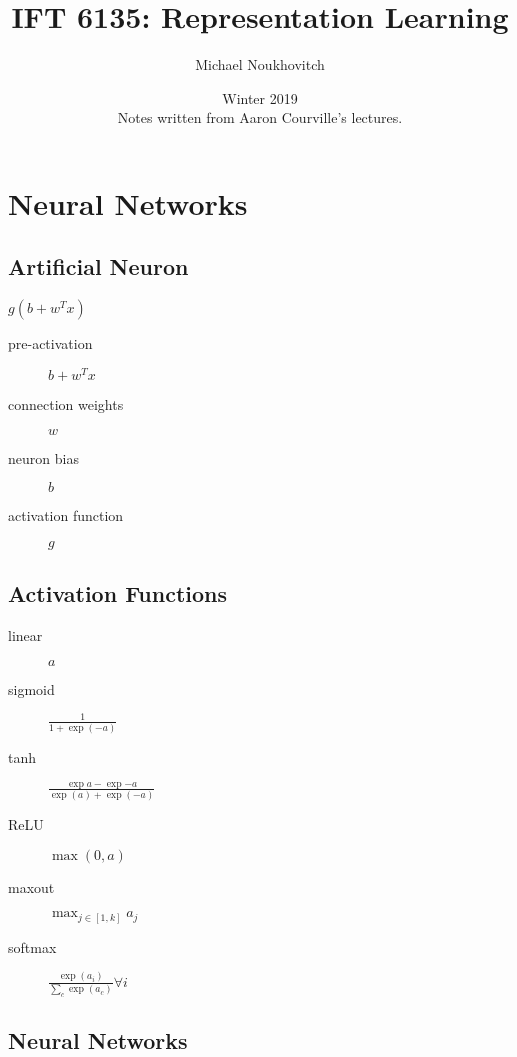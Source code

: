 \documentclass[]{article}
\begin{document}
\title{\bf{IFT 6135: Representation Learning}}
\date{Winter 2019 \\ \center Notes written from Aaron Courville's lectures.}
\author{Michael Noukhovitch}

\maketitle
\newpage
\tableofcontents
\newpage

\section{Neural Networks}%
\label{sec:neural_networks}

\subsection{Artificial Neuron}%
\label{sub:artificial_neuron}

$g(b + w^Tx)$
\begin{description}
    \item[pre-activation] $b + w^Tx$
    \item[connection weights] $w$
    \item[neuron bias] $b$
    \item[activation function] $g$
\end{description}

\subsection{Activation Functions}%
\label{sub:activation_functions}

\begin{description}
    \item[linear] $a$
    \item[sigmoid] $\frac{1}{1 + \exp(-a)}$
    \item[tanh] $\frac{\exp{a} - \exp{-a}}{\exp(a) + \exp(-a)}$
    \item[ReLU] $\max(0,a)$
    \item[maxout] $\max_{j \in [1,k]} a_j$
    \item[softmax] $\frac{\exp(a_i)}{\sum_c \exp(a_c)} \forall i$
\end{description}

\subsection{Neural Networks}%
\label{sub:single_layer_neural_network}
\end{document}
